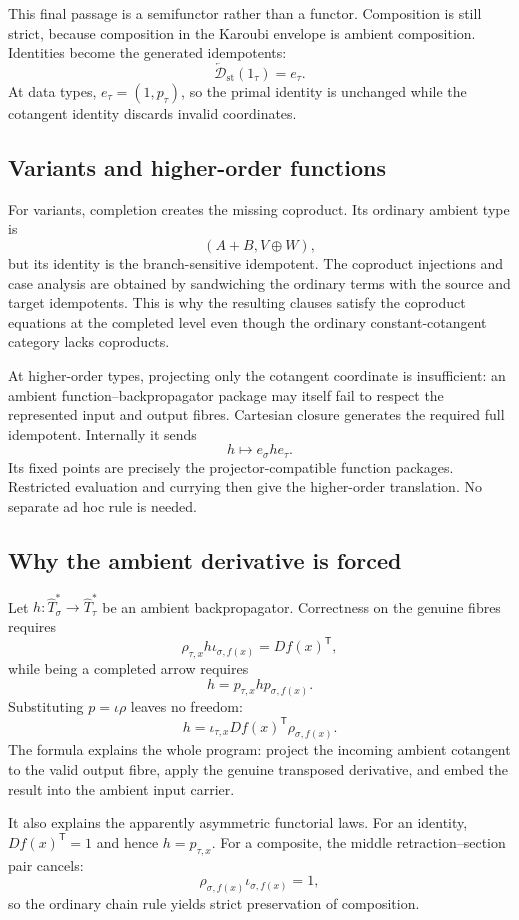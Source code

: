 \documentclass[runningheads,envcountsame]{llncs}
\newcommand{\Dst}{\overleftarrow{\mathcal D}_{\mathrm{st}}}
\begin{document}
This final passage is a semifunctor rather than a functor.  Composition is still
strict, because composition in the Karoubi envelope is ambient composition.
Identities become the generated idempotents:
$$
\Dst(1_\tau)=e_\tau.
$$
At data types, $e_\tau=(1,p_\tau)$, so the primal identity is unchanged
while the cotangent identity discards invalid coordinates.

\subsection{Variants and higher-order functions}

For variants, completion creates the missing coproduct.  Its ordinary ambient
type is
$$
(A+B,V\oplus W),
$$
but its identity is the branch-sensitive idempotent.  The coproduct injections
and case analysis are obtained by sandwiching the ordinary terms with the source
and target idempotents.  This is why the resulting clauses satisfy the
coproduct equations at the completed level even though the ordinary
constant-cotangent category lacks coproducts.

At higher-order types, projecting only the cotangent coordinate is insufficient:
an ambient function--backpropagator package may itself fail to respect the
represented input and output fibres.  Cartesian closure generates the required
full idempotent.  Internally it sends
$$
h\longmapsto e_\sigma h e_\tau.
$$
Its fixed points are precisely the projector-compatible function packages.
Restricted evaluation and currying then give the higher-order translation.  No
separate ad hoc rule is needed.

\subsection{Why the ambient derivative is forced}

Let $h:\widehat T^*_\sigma\to\widehat T^*_\tau$ be an ambient backpropagator.
Correctness on the genuine fibres requires
$$
\rho_{\tau,x}h\iota_{\sigma,f(x)}=Df(x)^{\mathsf T},
$$
while being a completed arrow requires
$$
h=p_{\tau,x}hp_{\sigma,f(x)}.
$$
Substituting $p=\iota\rho$ leaves no freedom:
$$
h
=
\iota_{\tau,x}Df(x)^{\mathsf T}\rho_{\sigma,f(x)}.
$$
The formula explains the whole program: project the incoming ambient cotangent
to the valid output fibre, apply the genuine transposed derivative, and embed
the result into the ambient input carrier.

It also explains the apparently asymmetric functorial laws.  For an identity,
$Df(x)^{\mathsf T}=1$ and hence $h=p_{\tau,x}$.  For a composite, the middle
retraction--section pair cancels:
$$
\rho_{\sigma,f(x)}\iota_{\sigma,f(x)}=1,
$$
so the ordinary chain rule yields strict preservation of composition.
\end{document}
